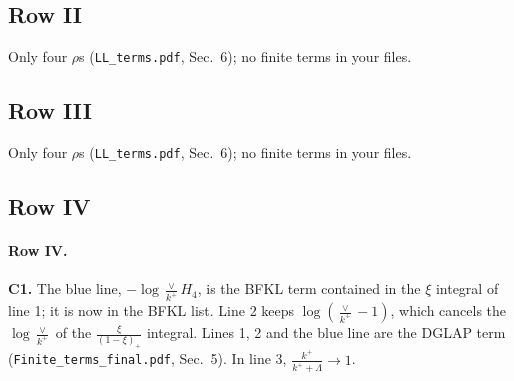 \documentclass[10pt]{article}
\numberwithin{equation}{section}
\newcommand{\new}[1]{{\color{blue}#1}}
\begin{document}
\subsection{Row II}
Only four $\rho$\textquotesingle s (\texttt{LL\_terms.pdf}, Sec.~6); no finite terms in your files.
\subsection{Row III}
Only four $\rho$\textquotesingle s (\texttt{LL\_terms.pdf}, Sec.~6); no finite terms in your files.
\subsection{Row IV}
\paragraph{Row IV.}
\textbf{C1.} The \new{blue} line, $-\log\frac{\vee}{k^+}H_4$, is the BFKL term contained in the $\xi$ integral of line 1; it is now in the BFKL list. Line 2 keeps $\log(\frac{\vee}{k^+}-1)$, which cancels the $\log\frac{\vee}{k^+}$ of the $\frac{\xi}{(1-\xi)_+}$ integral. Lines 1, 2 and the blue line are the DGLAP term (\texttt{Finite\_terms\_final.pdf}, Sec.~5). In line 3, $\frac{k^+}{k^++\Lambda}\to1$.
\end{document}
